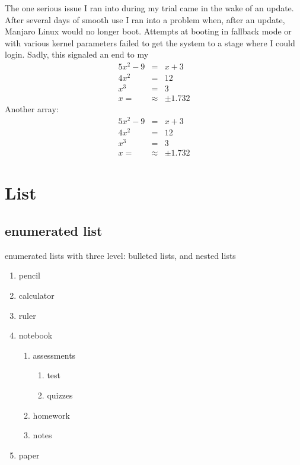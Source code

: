 \documentclass[11pt]{article}
\theoremstyle{definition}
\begin{document}
The one serious issue I ran into during my trial came in the wake of an update. After several days of smooth use I ran into a problem when, after an update, Manjaro Linux would no longer boot. Attempts at booting in fallback mode or with various kernel parameters failed to get the system to a stage where I could login. Sadly, this signaled an end to my\\
\begin{eqnarray}
5x^2 - 9 &=& x + 3\\
4x^2 &=& 12\\
x^3&=&3\\
x=&\approx&\pm1.732
\end{eqnarray}
Another array: \\
\begin{eqnarray*}
5x^2 - 9 &=& x + 3\\
4x^2 &=& 12\\
x^3&=&3\\
x=&\approx&\pm1.732
\end{eqnarray*}

\section{List}
	\subsection{enumerated list}
enumerated lists with three level: bulleted lists, and nested lists
\begin{enumerate}
	\item pencil
	\item calculator
	\item ruler
	\item notebook
		\begin{enumerate}
			\item assessments
			\begin{enumerate}
				\item test
				\item quizzes
			\end{enumerate}
			\item homework
			\item notes
		\end{enumerate}
	\item paper
\end{enumerate}
\end{document}
